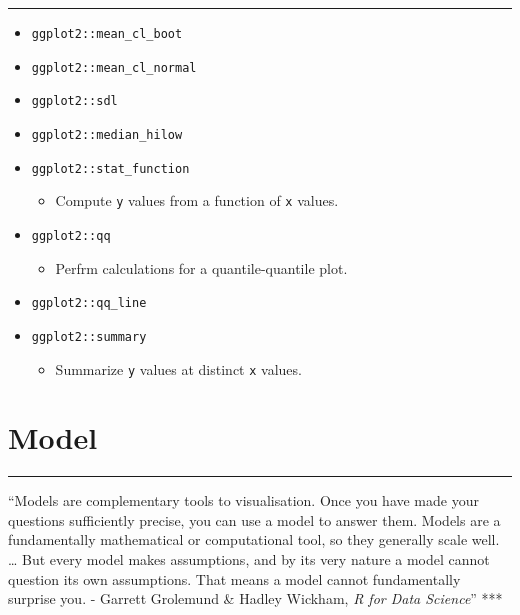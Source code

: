 \documentclass[
]{book}
\providecommand{\tightlist}{%
  \setlength{\itemsep}{0pt}\setlength{\parskip}{0pt}}
\begin{document}
\begin{center}\rule{0.5\linewidth}{0.5pt}\end{center}

\begin{itemize}
\tightlist
\item
  \texttt{ggplot2::mean\_cl\_boot}
\item
  \texttt{ggplot2::mean\_cl\_normal}
\item
  \texttt{ggplot2::sdl}
\item
  \texttt{ggplot2::median\_hilow}
\item
  \texttt{ggplot2::stat\_function}

  \begin{itemize}
  \tightlist
  \item
    Compute \texttt{y} values from a function of \texttt{x} values.
  \end{itemize}
\item
  \texttt{ggplot2::qq}

  \begin{itemize}
  \tightlist
  \item
    Perfrm calculations for a quantile-quantile plot.
  \end{itemize}
\item
  \texttt{ggplot2::qq\_line}
\item
  \texttt{ggplot2::summary}

  \begin{itemize}
  \tightlist
  \item
    Summarize \texttt{y} values at distinct \texttt{x} values.
  \end{itemize}
\end{itemize}

\hypertarget{model}{%
\chapter{Model}\label{model}}

\begin{center}\rule{0.5\linewidth}{0.5pt}\end{center}

``Models are complementary tools to visualisation. Once you have made your questions sufficiently precise, you can use a model to answer them. Models are a fundamentally mathematical or computational tool, so they generally scale well. \ldots{} But every model makes assumptions, and by its very nature a model cannot question its own assumptions. That means a model cannot fundamentally surprise you.
- Garrett Grolemund \& Hadley Wickham, \emph{R for Data Science}''
***
\end{document}
